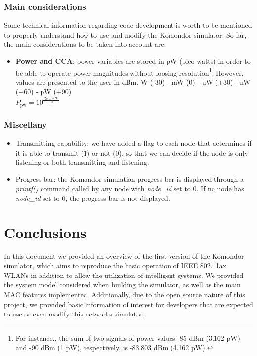 \documentclass[a4paper]{article}
\begin{document}
		\subsubsection{Main considerations}
		\label{section:development_considerations}
		Some technical information regarding code development is worth to be mentioned to properly understand how to use and modify the Komondor simulator. So far, the main considerations to be taken into account are:		
		\begin{itemize}
		\item \textbf{Power and CCA}: power variables are stored in pW (pico watts) in order to be able to operate power magnitudes without loosing resolution\footnote{For instance., the sum of two signals of power values -85 dBm (3.162 pW) and -90 dBm (1 pW), respectively, is -83.803 dBm (4.162 pW).}. However, values are presented to the user in dBm.		
		W (-30)  - mW (0)  - uW (+30) - nW (+60) - pW (+90)\\
		$P_{\text{pw}} = 10^{\frac{P_{\text{dBm}} + 90}{10}}$
		\end{itemize}
	
		\subsubsection{Miscellany}
		\label{section:development_miscellany}
			\begin{itemize}
			\item Transmitting capability: we have added a flag to each node that determines if it is able to transmit (1) or not (0), so that we can decide if the node is only listening or both transmitting and listening.
			\item Progress bar: the Komondor simulation progress bar is displayed through a \textit{printf()} command called by any node with \textit{node\_id} set to 0. If no node has \textit{node\_id} set to 0, the progress bar is not displayed.
			\end{itemize}
	
\section{Conclusions}
\label{section:conclusions}
In this document we provided an overview of the first version of the Komondor simulator, which aims to reproduce the basic operation of IEEE 802.11ax WLANs in addition to allow the utilization of intelligent systems. We provided the system model considered when building the simulator, as well as the main MAC features implemented. Additionally, due to the open source nature of this project, we provided basic information of interest for developers that are expected to use or even modify this networks simulator.
\end{document}
